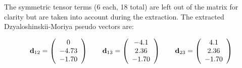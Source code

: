 \documentclass[12pt]{report}
\numberwithin{equation}{section}
\begin{document}

    


The symmetric tensor terms (6 each, 18 total) are left out of the matrix for clarity but are taken into account during the extraction.
The extracted Dzyaloshinskii-Moriya pseudo vectors are:

\[     \vb{d}_{12}=
    \left( \begin{array}{c}
    0  \\
    -4.73  \\
    -1.70
    \end{array} \right)
    \qquad
    \vb{d}_{13}=
    \left( \begin{array}{c}
    -4.1  \\
    2.36  \\
    -1.70
    \end{array} \right)
    \qquad    \vb{d}_{23}=
    \left( \begin{array}{c}
    4.1  \\
    2.36  \\
    -1.70
    \end{array} \right)
    \]
\end{document}
